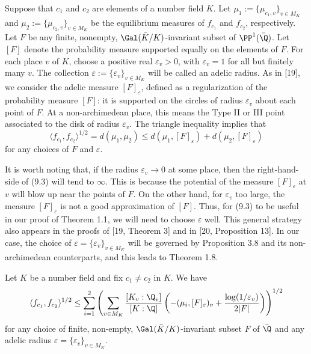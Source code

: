 Suppose that $c_1$ and $c_2$ are elements of a number field $K$. Let $\mu_1:=\{\mu_{c_1,v}\}_{v\in M_K}$ and $\mu_2:=\{\mu_{c_2,v}\}_{v\in M_K}$ be the equilibrium measures of $f_{c_1}$ and $f_{c_2}$, respectively. Let $F$ be any finite, nonempty, $\Gal(\bar K/K)$-invariant subset of $\PP^1(\bar\Q)$. Let $[F]$ denote the probability measure supported equally on the elements of $F$. For each place $v$ of $K$, choose a positive real $\varepsilon_v>0$, with $\varepsilon_v=1$ for all but finitely many $v$. The collection $\varepsilon:=\{\varepsilon_v\}_{v\in M_K}$ will be called an adelic radius. As in [19], we consider the adelic measure $[F]_{\varepsilon}$, defined as a regularization of the probability measure $[F]$: it is supported on the circles of radius $\varepsilon_v$ about each point of $F$. At a non-archimedean place, this means the Type II or III point associated to the disk of radius $\varepsilon_v$. The triangle inequality implies that
\begin{equation}
\langle f_{c_1},f_{c_2}\rangle^{1/2}=d(\mu_1,\mu_2)\leq d(\mu_1,[F]_{\varepsilon})+d(\mu_2,[F]_{\varepsilon})\tag{9.3}\label{DKY22:eq9.3}
\end{equation}
for any choices of $F$ and $\varepsilon$.

It is worth noting that, if the radius $\varepsilon_v\to0$ at some place, then the right-hand-side of (9.3) will tend to $\infty$. This is because the potential of the measure $[F]_{\varepsilon}$ at $v$ will blow up near the points of $F$. On the other hand, for $\varepsilon_v$ too large, the measure $[F]_{\varepsilon}$ is not a good approximation of $[F]$. Thus, for (9.3) to be useful in our proof of Theorem 1.1, we will need to choose $\varepsilon$ well. This general strategy also appears in the proofs of [19, Theorem 3] and in [20, Proposition 13]. In our case, the choice of $\varepsilon=\{\varepsilon_v\}_{v\in M_K}$ will be governed by Proposition 3.8 and its non-archimedean counterparts, and this leads to Theorem 1.8.

\begin{dkylemma}
Let $K$ be a number field and fix $c_1\neq c_2$ in $K$. We have
\[
\langle f_{c_1},f_{c_2}\rangle^{1/2}\leq\sum_{i=1}^{2}\left(\sum_{v\in M_K}\frac{[K_v:\Q_v]}{[K:\Q]}\left(-(\mu_i,[F]_{\varepsilon})_v+\frac{\log(1/\varepsilon_v)}{2|F|}\right)\right)^{1/2}
\]
for any choice of finite, non-empty, $\Gal(\bar K/K)$-invariant subset $F$ of $\bar\Q$ and any adelic radius $\varepsilon=\{\varepsilon_v\}_{v\in M_K}$.
\end{dkylemma}

